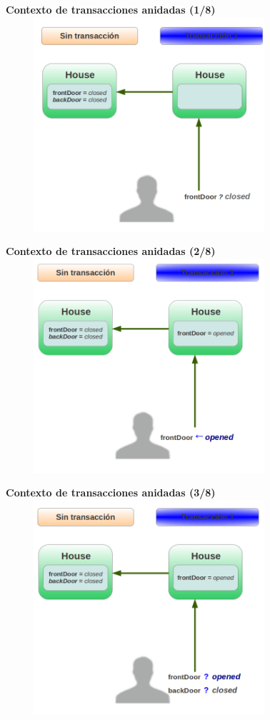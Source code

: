 	{\bf Contexto de transacciones anidadas (1/8)}\\
	\includegraphics[width=400px, height=300px]{img/contextoAninado1}
	
	{\bf Contexto de transacciones anidadas (2/8)}\\
	\includegraphics[width=400px, height=300px]{img/contextoAninado2}
	
	{\bf Contexto de transacciones anidadas (3/8)}\\
	\includegraphics[width=400px, height=300px]{img/contextoAninado3}
	
